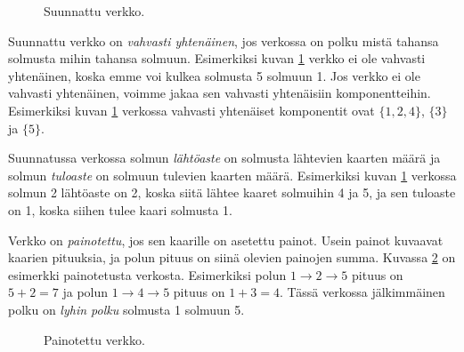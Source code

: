 \begin{figure}
\center
\begin{center}
\end{center}
\caption{Suunnattu verkko.}
\label{fig:versuu}
\end{figure}

Suunnattu verkko on \emph{vahvasti yhtenäinen},
jos verkossa on polku mistä tahansa solmusta
mihin tahansa solmuun.
Esimerkiksi kuvan \ref{fig:versuu} verkko ei
ole vahvasti yhtenäinen,
koska emme voi kulkea solmusta 5 solmuun 1.
Jos verkko ei ole vahvasti yhtenäinen,
voimme jakaa sen vahvasti yhtenäisiin komponentteihin.
Esimerkiksi kuvan \ref{fig:versuu} verkossa
vahvasti yhtenäiset komponentit ovat $\{1,2,4\}$, $\{3\}$ ja $\{5\}$.

Suunnatussa verkossa solmun \emph{lähtöaste} on
solmusta lähtevien kaarten määrä ja solmun \emph{tuloaste}
on solmuun tulevien kaarten määrä.
Esimerkiksi kuvan \ref{fig:versuu} verkossa
solmun 2 lähtöaste on 2, koska siitä lähtee kaaret solmuihin 4 ja 5,
ja sen tuloaste on 1, koska siihen tulee kaari solmusta 1.

Verkko on \emph{painotettu}, jos sen kaarille on asetettu painot.
Usein painot kuvaavat kaarien pituuksia, ja polun pituus
on siinä olevien painojen summa.
Kuvassa \ref{fig:verpai} on esimerkki painotetusta verkosta.
Esimerkiksi polun $1 \rightarrow 2 \rightarrow 5$ pituus on $5+2=7$
ja polun $1 \rightarrow 4 \rightarrow 5$ pituus on $1+3=4$.
Tässä verkossa jälkimmäinen polku on \emph{lyhin polku} solmusta 1 solmuun 5.

\begin{figure}
\center
\begin{center}
\end{center}
\caption{Painotettu verkko.}
\label{fig:verpai}
\end{figure}

